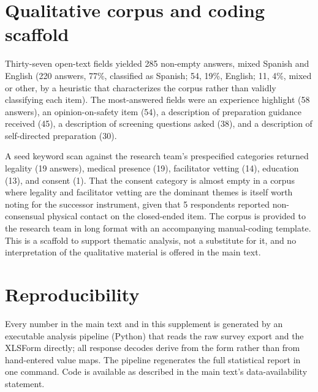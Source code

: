\documentclass[12pt]{article}
\begin{document}
\section{Qualitative corpus and coding scaffold}

Thirty-seven open-text fields yielded 285 non-empty answers, mixed Spanish and English (220 answers, 77\%,
classified as Spanish; 54, 19\%, English; 11, 4\%, mixed or other, by a heuristic that characterizes the
corpus rather than validly classifying each item). The most-answered fields were an experience highlight
(58 answers), an opinion-on-safety item (54), a description of preparation guidance received (45), a
description of screening questions asked (38), and a description of self-directed preparation (30).

A seed keyword scan against the research team's prespecified categories returned legality (19 answers),
medical presence (19), facilitator vetting (14), education (13), and consent (1). That the consent category
is almost empty in a corpus where legality and facilitator vetting are the dominant themes is itself worth
noting for the successor instrument, given that 5 respondents reported non-consensual physical contact on
the closed-ended item.
The corpus is provided to the research team in long format with an accompanying manual-coding template.
This is a scaffold to support thematic analysis, not a substitute for it, and no interpretation of the
qualitative material is offered in the main text.

\section{Reproducibility}

Every number in the main text and in this supplement is generated by an executable analysis pipeline
(Python) that reads the raw survey export and the XLSForm directly; all response decodes derive from the
form rather than from hand-entered value maps. The pipeline regenerates the full statistical report in one
command. Code is available as described in the main text's data-availability statement.
\end{document}

